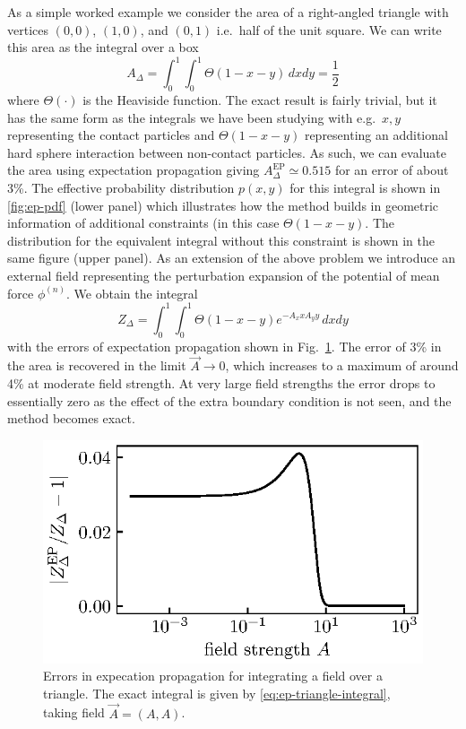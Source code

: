 \documentclass[11pt,twoside]{report}
\begin{document}
As a simple worked example we consider the area of a right-angled triangle with vertices $(0,0)$, $(1,0)$, and $(0,1)$ i.e.\ half of the unit square.
We can write this area as the integral over a box
\begin{equation}\label{eq:ep-area-integral}
  A_\Delta = \int_0^1 \int_0^1 \Theta(1 - x - y) \, dx dy
  = \frac{1}{2}
\end{equation}
where $\Theta(\cdot)$ is the Heaviside function.
The exact result is fairly trivial, but it has the same form as the integrals we have been studying with e.g.\ $x,y$ representing the contact particles and $\Theta(1 - x - y)$ representing an additional hard sphere interaction between non-contact particles.
As such, we can evaluate the area using expectation propagation giving $A_\Delta^\mathrm{EP} \simeq 0.515$ for an error of about 3\%.
The effective probability distribution $p(x,y)$ for this integral is shown in \ref{fig:ep-pdf} (lower panel) which illustrates how the method builds in geometric information of additional constraints (in this case $\Theta(1 - x - y)$.
The distribution for the equivalent integral without this constraint is shown in the same figure (upper panel).
As an extension of the above problem we introduce an external field representing the perturbation expansion of the potential of mean force $\phi^{(n)}$.
We obtain the integral
\begin{equation}\label{eq:ep-triangle-integral}
  Z_\Delta = \int_0^1 \int_0^1 \Theta(1 - x - y) e^{-A_x x  A_y y} \, dx dy
\end{equation}
with the errors of expectation propagation shown in Fig.\ \ref{fig:ep-errors}.
The error of 3\% in the area is recovered in the limit $\vec{A} \to 0$, which increases to a maximum of around 4\% at moderate field strength.
At very large field strengths the error drops to essentially zero as the effect of the extra boundary condition is not seen, and the method becomes exact.

\begin{figure}
  \includegraphics[width=0.9\linewidth,outer]{ep-errors}
  \caption[Errors in expectation propagation for integrating a field over a triangle]{
    Errors in expecation propagation for integrating a field over a triangle.
    The exact integral is given by \eqref{eq:ep-triangle-integral}, taking field $\vec{A} = (A, A)$.
  }
  \label{fig:ep-errors}
\end{figure}
\end{document}
